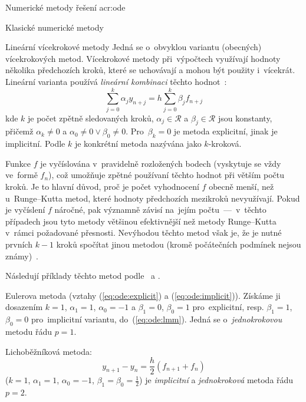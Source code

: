 \documentclass[thesis=M,czech]{FITthesis}[2012/06/26]
\newcommand{\acrlabel}[1]{acr:#1}
\newcommand{\acr}[1]{\acrshort{\acrlabel{#1}}}
\newcommand{\hl}[1]{\textit{#1}}
\newcommand{\cit}[1]{\cite{#1}}
\newcommand{\rf}[1]{\ref{#1}}
\newcommand{\rfeq}[1]{(\rf{eq:#1})}
\newcommand{\set}[1]{\ensuremath{\mathcal{#1}}}
\begin{document}
\begin{section}{Numerické metody řešení \acr{ode}}
\begin{subsection}{Klasické numerické metody}

\begin{subsubsection}{Lineární vícekrokové metody}
\label{sss:search:ode:classic:lmm}
Jedná se o~obvyklou variantu (obecných) vícekrokových metod.
Vícekrokové metody při~výpočtech využívají hodnoty několika předchozích kroků,
které se uchovávají a mohou být použity i~vícekrát.
Lineární varianta používá \hl{lineární kombinaci}
těchto hodnot~\cit{ode-nsolve-lec}:
\begin{equation}\label{eq:ode:lmm}
   \sum_{j=0}^{k} \alpha_{j} y_{n+j} =
      h \sum_{j=0}^{k} \beta_{j} f_{n+j}
\end{equation}
kde $k$ je počet zpětně sledovaných kroků,
${\alpha_{j} \in \set{R}}$ a ${\beta_{j} \in \set{R}}$ jsou konstanty,
přičemž ${\alpha_{k} \neq 0}$ a ${\alpha_{0} \neq 0 \lor \beta_{0} \neq 0}$.
Pro~${\beta_k = 0}$ je metoda explicitní, jinak je implicitní.
Podle $k$ je konkrétní metoda nazývána jako $k$-kroková.

Funkce $f$ je vyčíslována v~pravidelně rozložených bodech
(vyskytuje se vždy ve~formě $f_n$),
což umožňuje zpětné používaní těchto hodnot
při větším počtu kroků.
Je to hlavní důvod,
proč je počet vyhodnocení $f$
obecně menší, než u~Runge--Kutta metod,
které hodnoty předchozích mezikroků nevyužívají.
Pokud je vyčíslení $f$ náročné,
pak významně závisí na~jejím počtu~---~v~těchto případech
jsou tyto metody
většinou efektivnější než metody Runge--Kutta
v~rámci požadované přesnosti.
Nevýhodou těchto metod však je,
že je nutné prvních ${k-1}$ kroků spočítat jinou metodou
(kromě počátečních podmínek nejsou známy)~\cit{ode-nsolve-book}.

Následují příklady těchto metod
podle~\cit{ode-nsolve-lec} a \cit{ode-nsolve-book}.


\begin{paragraph}{Eulerova metoda}\label{p:search:ode:classic:lmm:euler}
(vztahy \rfeq{ode:explicit} a \rfeq{ode:implicit}).
Získáme ji dosazením ${k = 1}$, ${\alpha_{1} = 1}$, ${\alpha_{0} = -1}$
a ${\beta_{1} = 0}$, ${\beta_{0} = 1}$ pro~explicitní,
resp. ${\beta_{1} = 1}$, ${\beta_{0} = 0}$ pro~implicitní variantu,
do~\rfeq{ode:lmm}.
Jedná se o~\hl{jednokrokovou} metodu řádu ${p = 1}$.
\end{paragraph} %


\begin{paragraph}{Lichoběžníková metoda:}\label{p:search:ode:classic:lmm:trap}
\begin{equation}\label{eq:ode:lmm:trap}
   y_{n+1} - y_{n} = \frac{h}{2} \left( f_{n+1} + f_{n} \right)
\end{equation}
(${k = 1}$, ${\alpha_{1} = 1}$, ${\alpha_{0} = -1}$,
${\beta_{1} = \beta_{0} = \frac{1}{2}}$)
je \hl{implicitní} a \hl{jednokroková}
metoda řádu ${p = 2}$.
\end{paragraph} %


\end{subsubsection}
\end{subsection}
\end{section}
\end{document}
